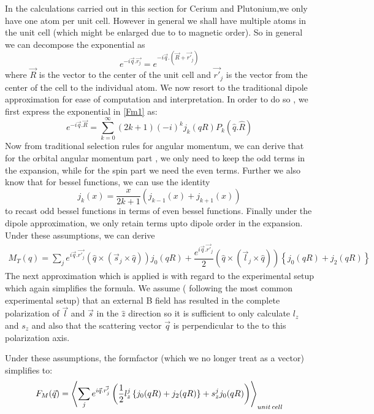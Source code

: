 \documentclass[10pt]{ruthesis}
\begin{document}
{In the calculations carried out in this section for Cerium and Plutonium,we only have one atom per unit cell. However in general we shall have multiple atoms in the unit cell (which might be enlarged due to to magnetic order). So in general we can decompose the exponential as
\begin{equation}
e^{-i\vec{q}.\vec{r_j}}= e^{-i\vec{q}.\left(\vec{R}+ \vec{r'}_j\right)}
\end{equation}
where $\vec{R}$ is the vector to the center of the unit cell and $\vec{r'}_j$ is the vector from the center of the cell to the individual atom.  We now resort to the traditional dipole approximation for ease of computation and interpretation. In order to do so , we first express the exponential in \ref{Fm1} as:
\begin{equation}
e^{-i\vec{q}.\vec{R}}= \sum^{\infty}_{k=0} (2k+1) (-i)^k j_k(qR) P_k(\hat{q}.\hat{R})
\end{equation}
Now from traditional selection rules for angular momentum, we can derive that for the orbital angular momentum part , we only need to keep the odd terms in the expansion, while for the spin part we need the even terms. Further we also know that for bessel functions, we can use the identity
\begin{equation}
j_k(x)= \frac{x}{2k+1} \left( j_{k-1}(x) +j_{k+1}(x)\right)
\end{equation}
to recast odd bessel functions in terms of even bessel functions. Finally under the dipole approximation, we only retain terms upto dipole order in the expansion. Under these assumptions, we can derive 
\begin{align}
M_T(q)= \sum_{j}  e^{i\vec{q}.\vec{r'_j}} \left( \hat{q} \times (\vec{s}_{j} \times \hat{q}) \right) j_{0}(qR)+ \dfrac{e^{i\vec{q}.\vec{r'}_j}}{2}\left( \hat{q}\times (\vec{l}_{j} \times \hat{q}) \right) \left \lbrace j_{0}(qR) +j_{2}(qR) \right \rbrace
\end{align}
The next approximation which is applied is with regard to the experimental setup which again simplifies the formula. We assume ( following the most common experimental setup) that an external B field has resulted in the complete polarization of $\vec{l}$ and $\vec{s}$ in the $\hat{z}$ direction so it is sufficient to only calculate $l_{z}$ and $s_{z}$ and also that the scattering vector $\vec{q}$ is perpendicular to the to this polarization axis. 

Under these assumptions, the formfactor (which we no longer treat as a vector) simplifies to:
 \begin{align}
 F_{M}(\vec q)= \left\langle \sum_{j}  e^{i\vec{q}.\vec{r'_j}} \left(\dfrac{1}{2}l^{j}_{z} \left \lbrace j_{0}(qR) +j_{2}(qR) \right \rbrace + s^{j}_{z} j_0(qR)  \right) \right\rangle _ {unit \hspace{0.5 mm} cell}
 \end{align}
 

}
\end{document}
